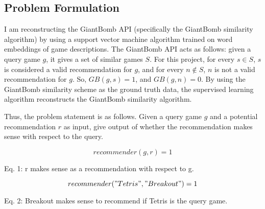 \documentclass[10pt,twocolumn]{article}
\begin{document}
\begin{comment}
    - Hyperparameter tuning

    - Outcome.

    Feed query game and potential recommendation into SVM. Then the output is whether or not the game should be recommended.
    
    Example runs / testcases:
    - SVM(query = Breakout, rec = Tetris) -> 1
    - SVM(query = Breakout, rec = Baldur's Gate) -> 0

    FIXME put image of testcases from VSCode terminal

    This outcome meets the goal of the project. The idea is to use supervised learning techniques to create a ML model that can perform this recommendation task (i.e., given g and r, say if r is an appropriate recommendation for g). The testcases show sample outputs of the pipeline. 
    
\end{comment}

\subsection{Problem Formulation}

I am reconstructing the GiantBomb API (specifically the GiantBomb similarity algorithm) by using a support vector machine algorithm trained on word embeddings of game descriptions. The GiantBomb API acts as follows: given a query game $g$, it gives a set of similar games $S$. For this project, for every $s \in S$, $s$ is considered a valid recommendation for $g$, and for every $n \not\in S$, $n$ is not a valid recommendation for $g$. So, $GB(g, s) = 1$, and $GB(g, n) = 0$. By using the GiantBomb similarity scheme as the ground truth data, the supervised learning algorithm reconstructs the GiantBomb similarity algorithm.

Thus, the problem statement is as follows. Given a query game $g$ and a potential recommendation $r$ as input, give output of whether the recommendation makes sense with respect to the query. 

\begin{equation}
    recommender(g, r) = 1
\end{equation}

Eq. 1: r makes sense as a recommendation with respect to g.

\begin{equation}
    recommender("Tetris", "Breakout") = 1
\end{equation}

Eq. 2: Breakout makes sense to recommend if Tetris is the query game.
\end{document}
